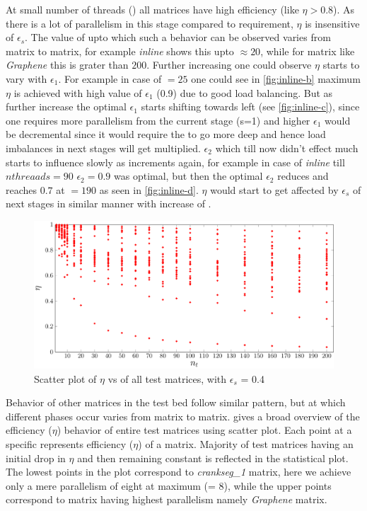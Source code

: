 At small number of threads (\nthreads) all matrices have high efficiency (like $\eta>0.8$). As there is a lot of parallelism in this stage compared to requirement, $\eta$ is insensitive of $\epsilon_s$. The value of \nthreads upto which such a behavior can be observed varies from matrix to matrix, for example \emph{inline} shows this upto \nthreads$\approx20$, while for matrix like \emph{Graphene} this is grater than $200$.  Further increasing \nthreads one could observe $\eta$ starts to vary with $\epsilon_1$. For example in case of \nthreads$ = 25$ one could see in \cref{fig:inline-b} maximum $\eta$ is achieved with high value of $\epsilon_1$ (0.9) due to good load balancing. But as 
\nthreads further increase the optimal $\epsilon_1$ starts shifting towards left (see \cref{fig:inline-c}),
 since one requires more parallelism from the current stage (s=1) and higher $\epsilon_1$ would be decremental since it would require the \levelTree to go more deep and hence load imbalances in next stages will get multiplied. $\epsilon_2$ which till now didn't effect much starts to influence slowly as \nthreads increments again, for example in case of \emph{inline} till $nthreaads=90$ $\epsilon_2=0.9$ was optimal, but then the optimal $\epsilon_2$ reduces and reaches $0.7$ at \nthreads$=190$ as seen in \cref{fig:inline-d}. $\eta$ would start to get affected by $\epsilon_s$ of next stages in similar manner with increase of \nthreads.
 
   \begin{figure}[tbhp]
   	\centering
   	\includegraphics[height=0.18\textheight,width=\textwidth]{pics/param_study/scatter_plot}
   	\caption{Scatter plot of $\eta$ vs \nthreads of all test matrices, with $\epsilon_s$ = 0.4}
   	\label{fig:param_all_mtx_stat}
   \end{figure}
   
Behavior of other matrices in the test bed follow similar pattern, but \nthreads at which different phases occur varies from matrix to matrix.   gives a broad overview of the efficiency ($\eta$) behavior of entire test matrices using scatter plot. Each point at a specific \nthreads represents efficiency ($\eta$) of a matrix. Majority of test matrices having an initial drop in $\eta$ and then remaining constant is reflected in the statistical plot. The lowest points in the plot correspond to \emph{crankseg\_1} matrix, here we achieve only a mere parallelism of eight at maximum (\threadEff = 8), while the upper points correspond to matrix having highest parallelism namely \emph{Graphene} matrix.

